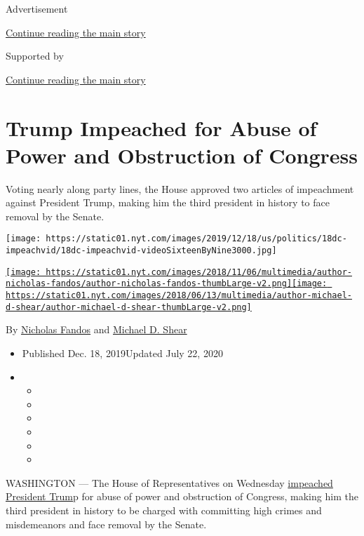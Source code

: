 Advertisement

\protect\hyperlink{after-top}{Continue reading the main story}

Supported by

\protect\hyperlink{after-sponsor}{Continue reading the main story}

\hypertarget{trump-impeached-for-abuse-of-power-and-obstruction-of-congress}{%
\section{Trump Impeached for Abuse of Power and Obstruction of
Congress}\label{trump-impeached-for-abuse-of-power-and-obstruction-of-congress}}

Voting nearly along party lines, the House approved two articles of
impeachment against President Trump, making him the third president in
history to face removal by the Senate.

\texttt{[image: https://static01.nyt.com/images/2019/12/18/us/politics/18dc-impeachvid/18dc-impeachvid-videoSixteenByNine3000.jpg]}

\href{https://www.nytimes.com/by/nicholas-fandos}{\texttt{[image: https://static01.nyt.com/images/2018/11/06/multimedia/author-nicholas-fandos/author-nicholas-fandos-thumbLarge-v2.png]}}\href{https://www.nytimes.com/by/michael-d-shear}{\texttt{[image: https://static01.nyt.com/images/2018/06/13/multimedia/author-michael-d-shear/author-michael-d-shear-thumbLarge-v2.png]}}

By \href{https://www.nytimes.com/by/nicholas-fandos}{Nicholas Fandos}
and \href{https://www.nytimes.com/by/michael-d-shear}{Michael D. Shear}

\begin{itemize}
\item
  Published Dec. 18, 2019Updated July 22, 2020
\item
  \begin{itemize}
  \item
  \item
  \item
  \item
  \item
  \item
  \end{itemize}
\end{itemize}

WASHINGTON --- The House of Representatives on Wednesday
\href{https://www.nytimes.com/2020/07/22/us/politics/trump-impeachment.html}{impeached
President Trum}p for abuse of power and obstruction of Congress, making
him the third president in history to be charged with committing high
crimes and misdemeanors and face removal by the Senate.

